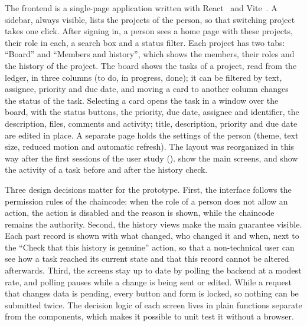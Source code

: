 The frontend is a single-page application written with React~\cite{react} and Vite~\cite{vite}. A sidebar, always visible, lists the projects of the person, so that switching project takes one click. After signing in, a person sees a home page with these projects, their role in each, a search box and a status filter. Each project has two tabs: ``Board'' and ``Members and history'', which shows the members, their roles and the history of the project. The board shows the tasks of a project, read from the ledger, in three columns (to do, in progress, done); it can be filtered by text, assignee, priority and due date, and moving a card to another column changes the status of the task. Selecting a card opens the task in a window over the board, with the status buttons, the priority, due date, assignee and identifier, the description, files, comments and activity; title, description, priority and due date are edited in place. A separate page holds the settings of the person (theme, text size, reduced motion and automatic refresh). The layout was reorganized in this way after the first sessions of the user study ().  show the main screens, and  show the activity of a task before and after the history check.


Three design decisions matter for the prototype. First, the interface follows the permission rules of the chaincode: when the role of a person does not allow an action, the action is disabled and the reason is shown, while the chaincode remains the authority. Second, the history views make the main guarantee visible. Each past record is shown with what changed, who changed it and when, next to the ``Check that this history is genuine'' action, so that a non-technical user can see how a task reached its current state and that this record cannot be altered afterwards. Third, the screens stay up to date by polling the backend at a modest rate, and polling pauses while a change is being sent or edited. While a request that changes data is pending, every button and form is locked, so nothing can be submitted twice. The decision logic of each screen lives in plain functions separate from the components, which makes it possible to unit test it without a browser.

